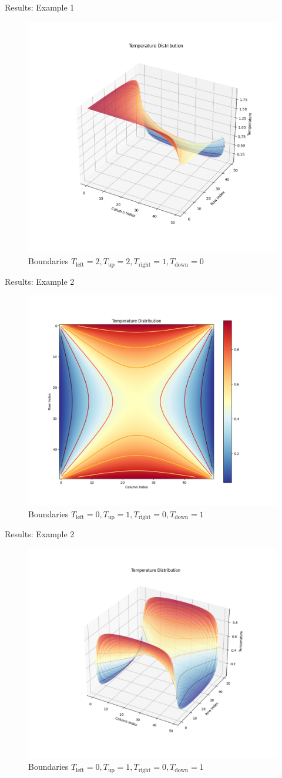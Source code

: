 \documentclass[aspectratio=169]{beamer}
\begin{document}
\begin{frame}{Results: Example 1}
  \begin{figure}
    \includegraphics[width=0.4\linewidth]{figures/Figure_2.png}
    \caption{Boundaries $T_{\text{left}}=2, T_{\text{up}}=2, T_{\text{right}}=1, T_{\text{down}}=0$}
  \end{figure}
\end{frame}

\begin{frame}{Results: Example 2}
  \begin{figure}
    \includegraphics[width=0.45\linewidth]{figures/Figure_3.png}
    \caption{Boundaries $T_{\text{left}}=0, T_{\text{up}}=1, T_{\text{right}}=0, T_{\text{down}}=1$}
  \end{figure}
\end{frame}

\begin{frame}{Results: Example 2}
  \begin{figure}
    \includegraphics[width=0.45\linewidth]{figures/Figure_4.png}
    \caption{Boundaries $T_{\text{left}}=0, T_{\text{up}}=1, T_{\text{right}}=0, T_{\text{down}}=1$}
  \end{figure}
\end{frame}
\end{document}
